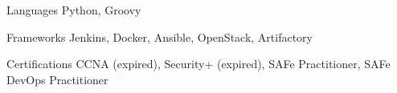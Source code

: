 
\begin{cvskills}
  \cvskill
    {Languages} %
    {Python, Groovy} %

  \cvskill
    {Frameworks} %
    {
        Jenkins,
        Docker,
        Ansible,
        OpenStack,
        Artifactory
    } %

  \cvskill
    {Certifications}
    {CCNA (expired), Security+ (expired), SAFe Practitioner, SAFe DevOps Practitioner}

\end{cvskills}
